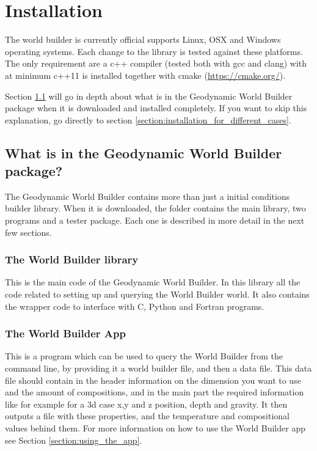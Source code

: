 \documentclass{book}
\newcommand{\GWB}{{Geodynamic World Builder}}
\newcommand{\WB}{{World Builder}}
\newcommand{\cmake}{{cmake}}
\begin{document}
\chapter{Installation}
\label{chapter:installation}
The world builder is currently official supports Linux, OSX and Windows operating systems. Each change to the library is tested against these platforms. The only requirement are a c++ compiler (tested both with gcc and clang) with at minimum c++11 is installed together with \cmake{} (\url{https://cmake.org/}). 

Section \ref{section:in_package} will go in depth about what is in the \GWB{} package when it is downloaded and installed completely. If you want to skip this explanation, go directly to section \ref{section:installation_for_different_cases}.


\section{What is in the \GWB{} package?}
\label{section:in_package}
The \GWB{} contains more than just a initial conditions builder library. When it is downloaded, the folder contains the main library, two programs and a tester package. Each one is described in more detail in the next few sections.

\subsection{The World Builder library}
This is the main code of the \GWB{}. In this library all the code related to setting up and querying the \WB{} world. It also contains the wrapper code to interface with C, Python and Fortran programs.

\subsection{The World Builder App}
This is a program which can be used to query the \WB{} from the command line, by providing it a world builder file, and then a data file. This data file should contain in the header information on the dimension you want to use and the amount of compositions, and in the main part the required information like for example for a 3d case x,y and z position, depth and gravity. It then outputs a file with these properties, and the temperature and compositional values behind them. For more information on how to use the World Builder app see Section \ref{section:using_the_app}.
\end{document}
